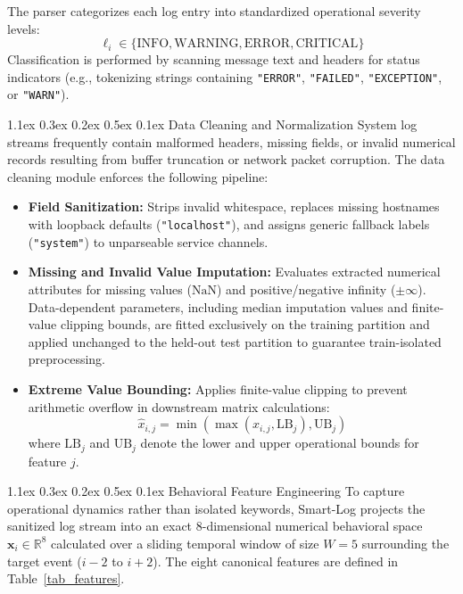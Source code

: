 \documentclass[10pt,conference]{IEEEtran}
\makeatletter
\renewcommand\subsection{\@startsection{subsection}{2}{\z@}%
  {1.1ex \@plus 0.3ex \@minus 0.2ex}%
  {0.5ex \@plus 0.1ex}%
  {\normalfont\fontsize{12pt}{14.4pt}\selectfont\bfseries}}
\makeatother
\begin{document}
The parser categorizes each log entry into standardized operational severity levels:
\begin{equation}
\ell_i \in \{\text{INFO}, \text{WARNING}, \text{ERROR}, \text{CRITICAL}\}
\end{equation}
Classification is performed by scanning message text and headers for status indicators (e.g., tokenizing strings containing \texttt{"ERROR"}, \texttt{"FAILED"}, \texttt{"EXCEPTION"}, or \texttt{"WARN"}).

\subsection{Data Cleaning and Normalization}
System log streams frequently contain malformed headers, missing fields, or invalid numerical records resulting from buffer truncation or network packet corruption. The data cleaning module enforces the following pipeline:
\begin{itemize}
\item \textbf{Field Sanitization:} Strips invalid whitespace, replaces missing hostnames with loopback defaults (\texttt{"localhost"}), and assigns generic fallback labels (\texttt{"system"}) to unparseable service channels.
\item \textbf{Missing and Invalid Value Imputation:} Evaluates extracted numerical attributes for missing values ($\text{NaN}$) and positive/negative infinity ($\pm\infty$). Data-dependent parameters, including median imputation values and finite-value clipping bounds, are fitted exclusively on the training partition and applied unchanged to the held-out test partition to guarantee train-isolated preprocessing.
\item \textbf{Extreme Value Bounding:} Applies finite-value clipping to prevent arithmetic overflow in downstream matrix calculations:
\begin{equation}
\hat{x}_{i,j} = \min\left(\max(x_{i,j}, \text{LB}_j), \text{UB}_j\right)
\end{equation}
where $\text{LB}_j$ and $\text{UB}_j$ denote the lower and upper operational bounds for feature $j$.
\end{itemize}

\subsection{Behavioral Feature Engineering}
To capture operational dynamics rather than isolated keywords, Smart-Log projects the sanitized log stream into an exact 8-dimensional numerical behavioral space $\mathbf{x}_i \in \mathbb{R}^8$ calculated over a sliding temporal window of size $W = 5$ surrounding the target event ($i-2$ to $i+2$). The eight canonical features are defined in Table~\ref{tab_features}.
\end{document}
